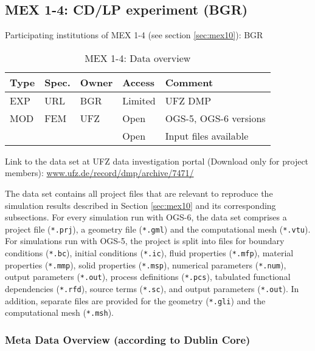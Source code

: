 \subsection{MEX 1-4: CD/LP experiment (BGR)}

Participating institutions of MEX 1-4 (see section \ref{sec:mex10}): BGR

\begin{table}[ht!]
\caption{MEX 1-4: Data overview}
\label{tab:dms-mex14-overview}
\small
\begin{tabular}{l|l|l|l|L{4.7cm}}
\hline
{}
Type & Spec. & Owner & Access     & Comment                       \\ 
\hline
EXP  &  URL  & BGR   & Limited    & UFZ DMP                       \\
\hline \hline
MOD  & FEM   & UFZ   & Open       & OGS-5, OGS-6 versions         \\
     &       &       & Open       & Input files available         \\
%
\hline
\end{tabular}
\end{table}
\normalsize

Link to the data set at UFZ data investigation portal (Download only for project members):
\url{www.ufz.de/record/dmp/archive/7471/}

The data set contains all project files that are relevant to reproduce the simulation results described in Section \ref{sec:mex10} and its corresponding subsections. For every simulation run with OGS-6, the data set comprises a project file (\texttt{*.prj}), a geometry file (\texttt{*.gml}) and the computational mesh (\texttt{*.vtu}). For simulations run with OGS-5, the project is split into files for boundary conditions (\texttt{*.bc}), initial conditions (\texttt{*.ic}), fluid properties (\texttt{*.mfp}), material properties (\texttt{*.mmp}), solid properties (\texttt{*.msp}), numerical parameters (\texttt{*.num}), output parameters (\texttt{*.out}), process definitions (\texttt{*.pcs}), tabulated functional dependencies (\texttt{*.rfd}), source terms (\texttt{*.sc}), and output parameters (\texttt{*.out}). In addition, separate files are provided for the geometry (\texttt{*.gli}) and the computational mesh (\texttt{*.msh}).

\subsubsection*{Meta Data Overview (according to Dublin Core)}

